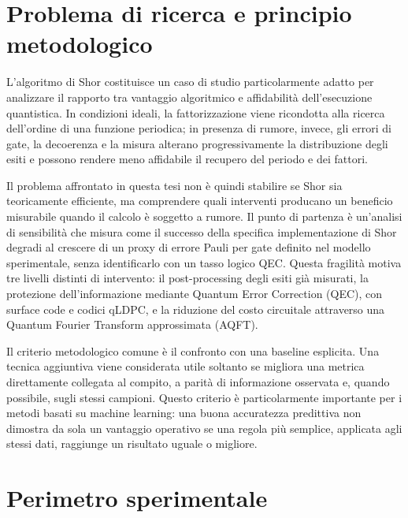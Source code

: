 
\section{Problema di ricerca e principio metodologico}\label{sec:finale_2_1}

L'algoritmo di Shor costituisce un caso di studio particolarmente adatto per analizzare il rapporto tra vantaggio algoritmico e affidabilità dell'esecuzione quantistica. In condizioni ideali, la fattorizzazione viene ricondotta alla ricerca dell'ordine di una funzione periodica; in presenza di rumore, invece, gli errori di gate, la decoerenza e la misura alterano progressivamente la distribuzione degli esiti e possono rendere meno affidabile il recupero del periodo e dei fattori. \cite{shor1994,preskill2018,skosana2021,smolin2013}

Il problema affrontato in questa tesi non è quindi stabilire se Shor sia teoricamente efficiente, ma comprendere quali interventi producano un beneficio misurabile quando il calcolo è soggetto a rumore. Il punto di partenza è un'analisi di sensibilità che misura come il successo della specifica implementazione di Shor degradi al crescere di un proxy di errore Pauli per gate definito nel modello sperimentale, senza identificarlo con un tasso logico QEC. Questa fragilità motiva tre livelli distinti di intervento: il post-processing degli esiti già misurati, la protezione dell'informazione mediante Quantum Error Correction (QEC), con surface code e codici qLDPC, e la riduzione del costo circuitale attraverso una Quantum Fourier Transform approssimata (AQFT).

Il criterio metodologico comune è il confronto con una baseline esplicita. Una tecnica aggiuntiva viene considerata utile soltanto se migliora una metrica direttamente collegata al compito, a parità di informazione osservata e, quando possibile, sugli stessi campioni. Questo criterio è particolarmente importante per i metodi basati su machine learning: una buona accuratezza predittiva non dimostra da sola un vantaggio operativo se una regola più semplice, applicata agli stessi dati, raggiunge un risultato uguale o migliore.

\section{Perimetro sperimentale}\label{sec:finale_2_2}\label{sec:use_case}

